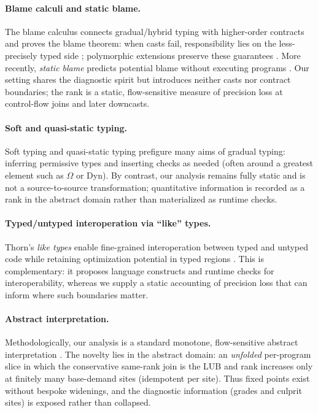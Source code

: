 \paragraph{Blame calculi and static blame.}
The blame calculus connects gradual/hybrid typing with higher-order contracts and proves the blame theorem: when casts fail, responsibility lies on the less-precisely typed side \cite{WadlerFindler2009}; polymorphic extensions preserve these guarantees \cite{AhmedFindlerSiekWadler2011}. More recently, \emph{static blame} predicts potential blame without executing programs \cite{SuCulpepper2024}. Our setting shares the diagnostic spirit but introduces neither casts nor contract boundaries; the rank is a static, flow-sensitive measure of precision loss at control-flow joins and later downcasts.

\paragraph{Soft and quasi-static typing.}
Soft typing \cite{CartwrightFagan1991} and quasi-static typing \cite{Thatte1990} prefigure many aims of gradual typing: inferring permissive types and inserting checks as needed (often around a greatest element such as $\Omega$ or \textsf{Dyn}). By contrast, our analysis remains fully static and is not a source-to-source transformation; quantitative information is recorded as a rank in the abstract domain rather than materialized as runtime checks.

\paragraph{Typed/untyped interoperation via ``like'' types.}
Thorn’s \emph{like types} enable fine-grained interoperation between typed and untyped code while retaining optimization potential in typed regions \cite{WrigstadEtAl2010}. This is complementary: it proposes language constructs and runtime checks for interoperability, whereas we supply a static accounting of precision loss that can inform where such boundaries matter.

\paragraph{Abstract interpretation.}
Methodologically, our analysis is a standard monotone, flow-sensitive abstract interpretation \cite{CousotCousot1977}. The novelty lies in the abstract domain: an \emph{unfolded} per-program slice in which the conservative same-rank join is the LUB and rank increases only at finitely many base-demand sites (idempotent per site). Thus fixed points exist without bespoke widenings, and the diagnostic information (grades and culprit sites) is exposed rather than collapsed.
